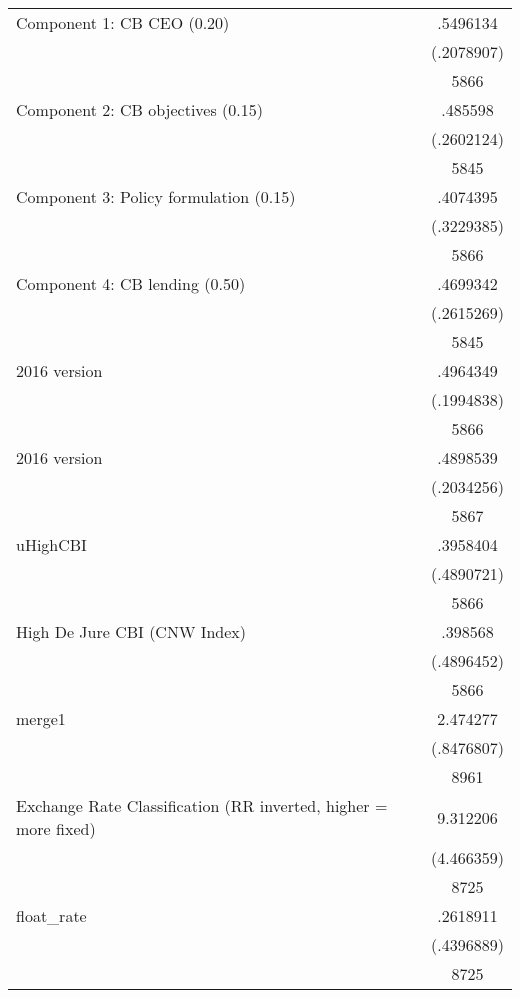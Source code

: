 {\begin{tabular}{l*{1}{c}}
Component 1: CB CEO (0.20)&    .5496134\\
                    &  (.2078907)\\
                    &        5866\\
Component 2: CB objectives (0.15)&     .485598\\
                    &  (.2602124)\\
                    &        5845\\
Component 3: Policy formulation (0.15)&    .4074395\\
                    &  (.3229385)\\
                    &        5866\\
Component 4: CB lending (0.50)&    .4699342\\
                    &  (.2615269)\\
                    &        5845\\
2016 version        &    .4964349\\
                    &  (.1994838)\\
                    &        5866\\
2016 version        &    .4898539\\
                    &  (.2034256)\\
                    &        5867\\
uHighCBI            &    .3958404\\
                    &  (.4890721)\\
                    &        5866\\
High De Jure CBI (CNW Index)&     .398568\\
                    &  (.4896452)\\
                    &        5866\\
merge1              &    2.474277\\
                    &  (.8476807)\\
                    &        8961\\
Exchange Rate Classification (RR inverted, higher = more fixed)&    9.312206\\
                    &  (4.466359)\\
                    &        8725\\
float\_rate          &    .2618911\\
                    &  (.4396889)\\
                    &        8725\\

\end{tabular}}
